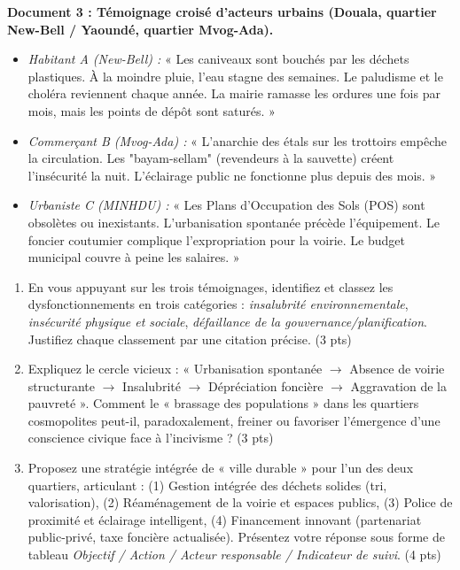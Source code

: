\documentclass[11pt]{article}
\begin{document}
\begin{exercice}
\textbf{Document 3 : Témoignage croisé d'acteurs urbains (Douala, quartier New-Bell / Yaoundé, quartier Mvog-Ada).}

\begin{itemize}
    \item \textit{Habitant A (New-Bell) :} « Les caniveaux sont bouchés par les déchets plastiques. À la moindre pluie, l'eau stagne des semaines. Le paludisme et le choléra reviennent chaque année. La mairie ramasse les ordures une fois par mois, mais les points de dépôt sont saturés. »
    \item \textit{Commerçant B (Mvog-Ada) :} « L'anarchie des étals sur les trottoirs empêche la circulation. Les "bayam-sellam" (revendeurs à la sauvette) créent l'insécurité la nuit. L'éclairage public ne fonctionne plus depuis des mois. »
    \item \textit{Urbaniste C (MINHDU) :} « Les Plans d'Occupation des Sols (POS) sont obsolètes ou inexistants. L'urbanisation spontanée précède l'équipement. Le foncier coutumier complique l'expropriation pour la voirie. Le budget municipal couvre à peine les salaires. »
\end{itemize}

\begin{enumerate}
    \item En vous appuyant sur les trois témoignages, identifiez et classez les dysfonctionnements en trois catégories : \textit{insalubrité environnementale}, \textit{insécurité physique et sociale}, \textit{défaillance de la gouvernance/planification}. Justifiez chaque classement par une citation précise. (3 pts)
    \item Expliquez le cercle vicieux : « Urbanisation spontanée $\rightarrow$ Absence de voirie structurante $\rightarrow$ Insalubrité $\rightarrow$ Dépréciation foncière $\rightarrow$ Aggravation de la pauvreté ». Comment le « brassage des populations » dans les quartiers cosmopolites peut-il, paradoxalement, freiner ou favoriser l'émergence d'une conscience civique face à l'incivisme ? (3 pts)
    \item Proposez une stratégie intégrée de « ville durable » pour l'un des deux quartiers, articulant : (1) Gestion intégrée des déchets solides (tri, valorisation), (2) Réaménagement de la voirie et espaces publics, (3) Police de proximité et éclairage intelligent, (4) Financement innovant (partenariat public-privé, taxe foncière actualisée). Présentez votre réponse sous forme de tableau \textit{Objectif / Action / Acteur responsable / Indicateur de suivi}. (4 pts)
\end{enumerate}
\end{exercice}
\end{document}
